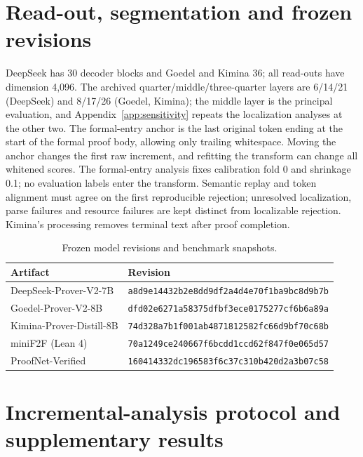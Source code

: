 \section{Read-out, segmentation and frozen revisions}\label{app:readout}

DeepSeek has 30 decoder blocks and Goedel and Kimina 36; all read-outs have dimension 4,096. The archived quarter/middle/three-quarter layers are 6/14/21 (DeepSeek) and 8/17/26 (Goedel, Kimina); the middle layer is the principal evaluation, and Appendix~\ref{app:sensitivity} repeats the localization analyses at the other two. The formal-entry anchor is the last original token ending at the start of the formal proof body, allowing only trailing whitespace. Moving the anchor changes the first raw increment, and refitting the transform can change all whitened scores. The formal-entry analysis fixes calibration fold 0 and shrinkage 0.1; no evaluation labels enter the transform. Semantic replay and token alignment must agree on the first reproducible rejection; unresolved localization, parse failures and resource failures are kept distinct from localizable rejection. Kimina's processing removes terminal text after proof completion.

\begin{table}[h]
\caption{Frozen model revisions and benchmark snapshots.}
\label{tab:revisions}
\begin{center}
\small
\begin{tabular}{ll}
\toprule
Artifact & Revision\\
\midrule
DeepSeek-Prover-V2-7B & \texttt{a8d9e14432b2e8dd9df2a4d4e70f1ba9bc8d9b7b}\\
Goedel-Prover-V2-8B & \texttt{dfd02e6271a58375dfbf3ece0175277cf6b6a89a}\\
Kimina-Prover-Distill-8B & \texttt{74d328a7b1f001ab4871812582fc66d9bf70c68b}\\
miniF2F (Lean 4) & \texttt{70a1249ce240667f6bcdd1ccd62f847f0e065d57}\\
ProofNet-Verified & \texttt{160414332dc196583f6c37c310b420d2a3b07c58}\\
\bottomrule
\end{tabular}
\end{center}
\end{table}

\section{Incremental-analysis protocol and supplementary results}\label{app:incremental}

